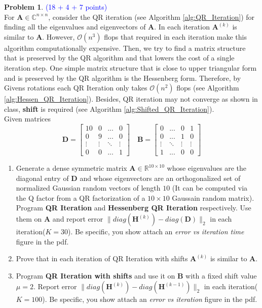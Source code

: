 \documentclass[english,onecolumn]{IEEEtran}
\begin{document}
\noindent\textbf{Problem 1}. \textcolor{blue}{(18 + 4 + 7 points)}\\
For $\mathbf{A} \in \mathbb{C}^{n \times n}$, consider the QR iteration (see Algorithm \ref{alg:QR_Iteration}) for finding all the eigenvalues and eigenvectors of $\mathbf{A}$. In each iteration $\mathbf{A}^{(k)}$ is similar to $\mathbf{A}$. However, $\mathcal{O}(n^3)$ flops that required in each iteration make this algorithm computationally expensive. Then, we try to find a matrix structure that is preserved by the QR algorithm and that lowers the cost of a single iteration step. One simple matrix structure that is close to upper triangular form and is preserved by the QR algorithm is the Hessenberg form. Therefore, by Givens rotations each QR Iteration only takes $\mathcal{O}(n^2)$ flops (see Algorithm \ref{alg:Hessen_QR_Iteration}). Besides, QR iteration may not converge as shown in class, \textbf{shift} is required (see Algorithm \ref{alg:Shifted_QR_Iteration}).
\\
Given matrices
$$\mathbf{D} = \begin{bmatrix}10 & 0 & ... & 0\\
0 & 9 & ... & 0\\
\vdots & \vdots & \ddots & \vdots \\
0 & 0 & ... & 1 \end{bmatrix} \quad
\mathbf{B} = \begin{bmatrix}
0 & ... &0 & 1\\
0 & ...& 1& 0\\
\vdots & \ddots & \vdots & \vdots\\
1 & ... & 0 & 0
\end{bmatrix}$$
\begin{enumerate}
    \item Generate a dense symmetric matrix $\mathbf{A}\in \mathbb{R}^{10\times 10}$ whose eigenvalues are the diagonal entry of $\mathbf{D}$ and whose eigenvectors are an orthogonalized set of normalized Gaussian random vectors of length $10$ (It can be computed via the Q factor from a QR factorization of a $10\times 10$ Gaussain random matrix).
    Program \textbf{QR Iteration} and \textbf{Hessenberg QR Iteration} respectively. Use them on $\mathbf{A}$ and report error $\|diag(\mathbf{H}^{(k)}) - diag(\mathbf{D})\|_2$ in each iteration($K = 30$). Be specific, you show attach an \textit{error vs iteration time} figure in the pdf.
    \item Prove that in each iteration of QR Iteration with shifts $\mathbf{A}^{(k)}$ is similar to $\mathbf{A}$.
    \item Program \textbf{QR Iteration with shifts} and use it on $\mathbf{B}$ with a fixed shift value $\mu = 2$. Report error $\|diag(\mathbf{H}^{(k)}) - diag(\mathbf{H}^{(k-1)})\|_2$ in each iteration($K = 100$). Be specific, you show attach an \textit{error vs iteration} figure in the pdf.
\end{enumerate}
\end{document}
